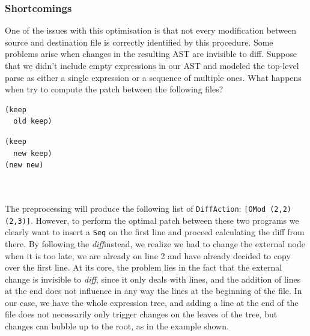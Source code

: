 \documentclass[11pt, titlepage]{article}
\newcommand{\toHaskell}[1]{\texttt{#1}\xspace}
\newcommand{\diff}{\emph{diff}}
\begin{document}
\subsubsection{Shortcomings}
One of the issues with this optimisation is that not every modification between source and destination file is correctly identified by this procedure. Some problems arise when changes in the resulting AST are invisible to diff. Suppose that we didn't include empty expressions in our AST and modeled the top-level parse as either a single expression or a sequence of multiple ones. 
What happens when try to compute the patch between the following files?
\\
\begin{minipage}[t]{0.5\textwidth}
\begin{verbatim}
(keep
  old keep)
\end{verbatim}
\end{minipage}
\begin{minipage}{0.5\textwidth}
\begin{verbatim}
(keep
  new keep)
(new new)
\end{verbatim}
\end{minipage}
\\
\\
The preprocessing will produce the following list of \toHaskell{DiffAction}:
\toHaskell{[OMod (2,2) (2,3)]}. 
However, to perform the optimal patch between these two programs we clearly want to insert a \texttt{Seq} on the first line and proceed calculating the diff from there. 
By following the \diff instead, we realize we had to change the external node when it is too late, we are already on line 2 and have already decided to copy over the first line. 
At its core, the problem lies in the fact that the external change is invisible to \diff, since it only deals with lines, and the addition of lines at the end does not influence in any way the lines at the beginning of the file. 
In our case, we have the whole expression tree, and adding a line at the end of the file does not necessarily only trigger changes on the leaves of the tree, but changes can bubble up to the root, as in the example shown.
\end{document}
